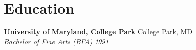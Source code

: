 \section{Education}
\resumeSubHeadingListStart
    \item
        \textbf{University of Maryland, College Park} \hfill \textcolor{primaryColor}{College Park, MD} \\
        \textcolor{tertiaryColor}{\textit{Bachelor of Fine Arts (BFA)}} \hfill \textcolor{secondaryColor}{\textit{1991}}
\resumeSubHeadingListEnd 